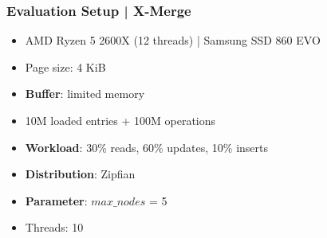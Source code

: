 \documentclass[xcolor=dvipsnames]{beamer}
\begin{document}
%

\begin{frame}
	\frametitle{Evaluation Setup | X-Merge}
	\begin{center}
		\begin{itemize}
			\item AMD Ryzen 5 2600X (12 threads) | Samsung SSD 860 EVO
			\item Page size: 4 KiB
			\item \textbf{Buffer}: limited memory 
			\item 10M loaded entries + 100M operations
			\item \textbf{Workload}: 30\% reads, 60\% updates, 10\% inserts
			\item \textbf{Distribution}: Zipfian
			\item \textbf{Parameter}: $max\_nodes$ = 5
			\item Threads: 10
		\end{itemize}
	\end{center}	
\end{frame}
\end{document}
